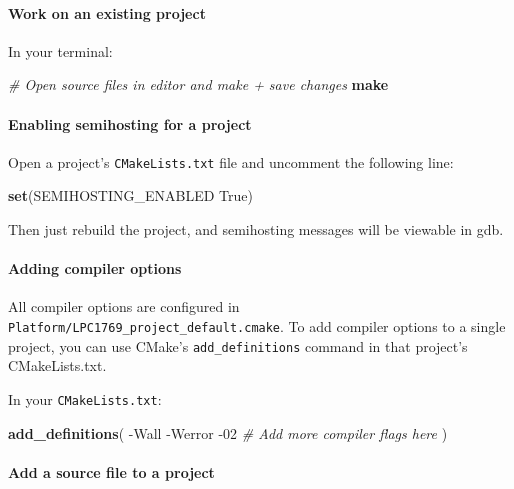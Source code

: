 \documentclass[]{article}
\newenvironment{Shaded}{\begin{snugshade}}{\end{snugshade}}
\newcommand{\KeywordTok}[1]{\textcolor[rgb]{0.13,0.29,0.53}{\textbf{{#1}}}}
\newcommand{\CommentTok}[1]{\textcolor[rgb]{0.56,0.35,0.01}{\textit{{#1}}}}
\newcommand{\NormalTok}[1]{{#1}}
\begin{document}
\paragraph{Work on an existing project}

In your terminal:

\begin{Shaded}
\begin{Highlighting}[]
    \CommentTok{# Open source files in editor and make + save changes}
    \KeywordTok{make}
\end{Highlighting}
\end{Shaded}

\paragraph{Enabling semihosting for a project}

Open a project's \texttt{CMakeLists.txt} file and uncomment the
following line:

\begin{Shaded}
\begin{Highlighting}[]
    \KeywordTok{set}\NormalTok{(SEMIHOSTING_ENABLED True)}
\end{Highlighting}
\end{Shaded}

Then just rebuild the project, and semihosting messages will be viewable
in gdb.

\paragraph{Adding compiler options}

All compiler options are configured in
\texttt{Platform/LPC1769\_project\_default.cmake}. To add compiler
options to a single project, you can use CMake's
\texttt{add\_definitions} command in that project's CMakeLists.txt.

In your \texttt{CMakeLists.txt}:

\begin{Shaded}
\begin{Highlighting}[]
    \KeywordTok{add_definitions}\NormalTok{(}
      \NormalTok{-Wall}
      \NormalTok{-Werror}
      \NormalTok{-02}
      \CommentTok{# Add more compiler flags here}
    \NormalTok{)}
\end{Highlighting}
\end{Shaded}

\paragraph{Add a source file to a project}
\end{document}

